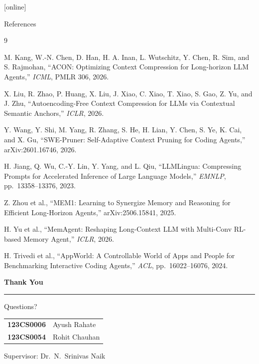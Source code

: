 \documentclass[usenames,dvipsnames,aspectratio=169,10pt]{beamer}
\begin{document}
[online]
\begin{frame}{References}
\scriptsize
\begin{thebibliography}{9}

 M. Kang, W.-N. Chen, D. Han, H. A. Inan, L. Wutschitz, Y. Chen,
R. Sim, and S. Rajmohan, ``ACON: Optimizing Context Compression for
Long-horizon LLM Agents,'' \emph{ICML}, PMLR 306, 2026.

 X. Liu, R. Zhao, P. Huang, X. Liu, J. Xiao, C. Xiao, T. Xiao,
S. Gao, Z. Yu, and J. Zhu, ``Autoencoding-Free Context Compression for LLMs via
Contextual Semantic Anchors,'' \emph{ICLR}, 2026.

 Y. Wang, Y. Shi, M. Yang, R. Zhang, S. He, H. Lian,
Y. Chen, S. Ye, K. Cai, and X. Gu, ``SWE-Pruner: Self-Adaptive Context Pruning
for Coding Agents,'' arXiv:2601.16746, 2026.

 H. Jiang, Q. Wu, C.-Y. Lin, Y. Yang, and L. Qiu,
``LLMLingua: Compressing Prompts for Accelerated Inference of Large Language
Models,'' \emph{EMNLP}, pp.~13358--13376, 2023.

 Z. Zhou et al., ``MEM1: Learning to Synergize Memory and
Reasoning for Efficient Long-Horizon Agents,'' arXiv:2506.15841, 2025.

 H. Yu et al., ``MemAgent: Reshaping Long-Context LLM with
Multi-Conv RL-based Memory Agent,'' \emph{ICLR}, 2026.

 H. Trivedi et al., ``AppWorld: A Controllable World of Apps
and People for Benchmarking Interactive Coding Agents,'' \emph{ACL},
pp.~16022--16076, 2024.

\end{thebibliography}
\end{frame}

\begin{frame}[plain]
\vfill
\begin{center}
  {\Huge\bfseries\color{UFPelAzul} Thank You}

  \vspace{0.4cm}
  \rule{0.45\textwidth}{0.8pt}

  \vspace{0.4cm}
  {\Large Questions?}

  \vspace{0.8cm}
  \footnotesize
  \begin{tabular}{r@{\hspace{0.8em}}l}
    \textbf{123CS0006} & Ayush Rahate\\
    \textbf{123CS0054} & Rohit Chauhan
  \end{tabular}

  \vspace{0.3cm}
  \footnotesize Supervisor: Dr.~N.~Srinivas Naik
\end{center}
\vfill
\end{frame}
\end{document}
